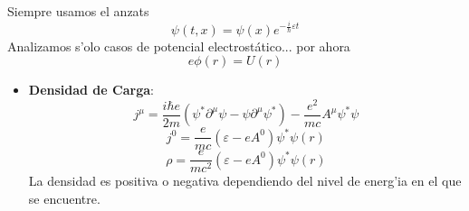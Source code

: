 Siempre usamos el anzats
\begin{equation}
\psi\left(  t,x\right)  =\psi\left(  x\right)  e^{-\frac{i}{\hbar}\varepsilon
t}%
\end{equation}
Analizamos s'olo casos de potencial electrost\'{a}tico... por ahora
\begin{equation}
e\phi\left(  r\right)  =U\left(  r\right)
\end{equation}


\begin{itemize}
\item \textbf{Densidad de Carga}:
\begin{equation}
j^{\mu}=\frac{i\hbar e}{2m}\left(  \psi^{\ast}\partial^{\mu}\psi
-\psi\partial^{\mu}\psi^{\ast}\right)  -\frac{e^{2}}{mc}A^{\mu}\psi^{\ast
}\psi
\end{equation}
\begin{equation}
j^{0}=\frac{e}{mc}\left(  \varepsilon-eA^{0}\right)  \psi^{\ast}%
\psi\left(  r\right)
\end{equation}
\begin{equation}
\rho=\frac{e}{mc^{2}}\left(  \varepsilon-eA^{0}\right)  \psi^{\ast}%
\psi\left(  r\right)
\end{equation}
La densidad es positiva o negativa dependiendo del nivel de energ'ia en el
que se encuentre.


\end{itemize}
